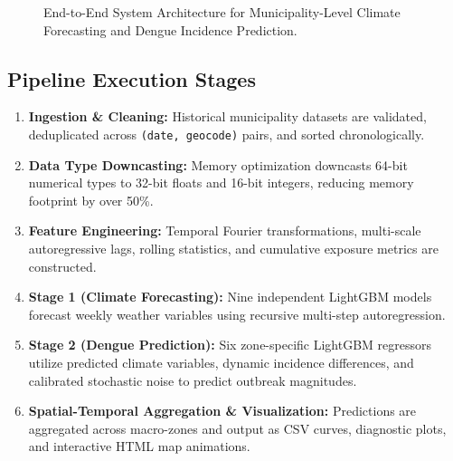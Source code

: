 \documentclass[journal,onecolumn,11pt]{IEEEtran}
\begin{document}
\begin{figure}[h!]
{%
}
\caption{End-to-End System Architecture for Municipality-Level Climate Forecasting and Dengue Incidence Prediction.}
\label{fig:pipeline_flowchart}
\end{figure}

\subsection{Pipeline Execution Stages}
\begin{enumerate}
    \item \textbf{Ingestion \& Cleaning:} Historical municipality datasets are validated, deduplicated across \texttt{(date, geocode)} pairs, and sorted chronologically.
    \item \textbf{Data Type Downcasting:} Memory optimization downcasts 64-bit numerical types to 32-bit floats and 16-bit integers, reducing memory footprint by over 50\%.
    \item \textbf{Feature Engineering:} Temporal Fourier transformations, multi-scale autoregressive lags, rolling statistics, and cumulative exposure metrics are constructed.
    \item \textbf{Stage 1 (Climate Forecasting):} Nine independent LightGBM models forecast weekly weather variables using recursive multi-step autoregression.
    \item \textbf{Stage 2 (Dengue Prediction):} Six zone-specific LightGBM regressors utilize predicted climate variables, dynamic incidence differences, and calibrated stochastic noise to predict outbreak magnitudes.
    \item \textbf{Spatial-Temporal Aggregation \& Visualization:} Predictions are aggregated across macro-zones and output as CSV curves, diagnostic plots, and interactive HTML map animations.
\end{enumerate}
\end{document}
